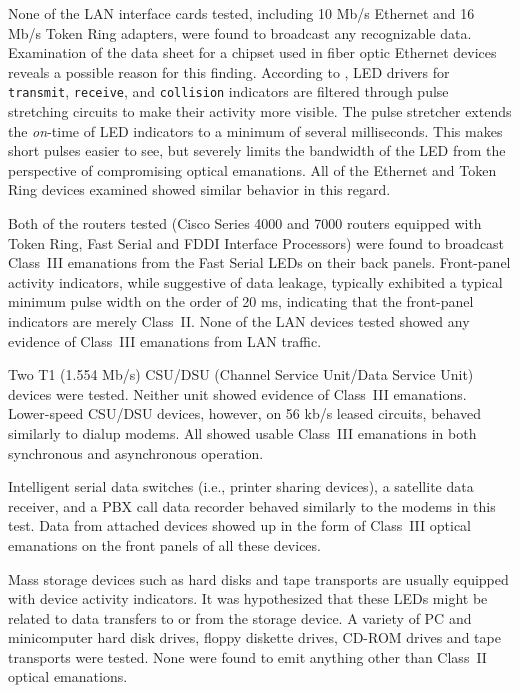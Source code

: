 \documentclass{acmtrans2e}
\begin{document}
None of the LAN interface cards tested, including 
10 Mb/s Ethernet and 16 Mb/s Token Ring adapters, were found to 
broadcast any recognizable data.  Examination of the data sheet for a 
chipset used in fiber optic Ethernet devices reveals a possible reason 
for this finding.  According to \cite{hp_led_data_sheet}, LED drivers 
for {\tt transmit}, {\tt receive}, and {\tt collision} indicators are filtered 
through pulse stretching circuits to make their activity more visible.  
The pulse stretcher extends the {\it on}-time of LED indicators to a minimum 
of several milliseconds.  This makes short pulses easier to see, but 
severely limits the bandwidth of the LED from the perspective of 
compromising optical emanations.  All of the Ethernet and Token Ring 
devices examined showed similar behavior in this regard.

Both of the routers tested (Cisco Series 4000 and 7000 routers equipped 
with Token Ring, Fast Serial and FDDI Interface Processors) were found 
to broadcast Class~III emanations from the Fast Serial
LEDs on their back panels.  Front-panel activity indicators, while 
suggestive of data leakage, typically exhibited a typical minimum pulse 
width on the order of 20 ms, indicating that the front-panel indicators
are merely Class~II.  None of the LAN
devices tested showed any evidence of Class~III emanations from LAN traffic.

Two T1 (1.554 Mb/s) CSU/DSU (Channel Service Unit/Data Service Unit)
devices were tested.  Neither unit showed evidence of Class~III 
emanations.  Lower-speed CSU/DSU devices, however, on 56 kb/s leased
circuits, behaved similarly to dial\-up modems.  All showed usable
Class~III emanations in both synchronous and asynchronous operation.

Intelligent serial data switches (i.e., printer sharing devices), a
satellite data receiver, and a PBX call
data recorder behaved similarly to the modems in this test.  Data from 
attached devices showed up in the form of Class~III optical emanations
on the front panels of all these devices.

Mass storage devices such as hard disks and tape transports are usually 
equipped with device activity indicators.  It was hypothesized that 
these LEDs might be related to data transfers to or from the storage 
device.  A variety of PC and minicomputer hard disk drives, floppy 
diskette drives, CD-ROM drives and tape transports were tested.  None 
were found to emit anything other than Class~II optical emanations.
 
\end{document}
